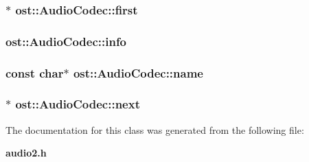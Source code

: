 \subsubsection[{first}]{$\ast$ {\bf ost::AudioCodec::first}\hspace{0.3cm}{\ttfamily  [static, protected]}}\label{classost_1_1_audio_codec_a44ca187dbb88f91fc675f08aef30e523}
\subsubsection[{info}]{ {\bf ost::AudioCodec::info}\hspace{0.3cm}{\ttfamily  [protected]}}\label{classost_1_1_audio_codec_a4fb14af1f9c82f3b536f1c6ab8b53f69}
\subsubsection[{name}]{\setlength{\rightskip}{0pt plus 5cm}const char$\ast$ {\bf ost::AudioCodec::name}\hspace{0.3cm}{\ttfamily  [protected]}}\label{classost_1_1_audio_codec_a7eea163ba29813a936ccac616c83bb18}
\subsubsection[{next}]{$\ast$ {\bf ost::AudioCodec::next}\hspace{0.3cm}{\ttfamily  [protected]}}\label{classost_1_1_audio_codec_acd455c04876aa5c5a42bd8fc9e43f620}


The documentation for this class was generated from the following file:\begin{DoxyCompactItemize}
\item 
{\bf audio2.h}\end{DoxyCompactItemize}
